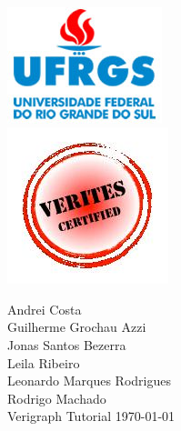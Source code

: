 \documentclass[12pt]{article}
\begin{document}
\begin{titlepage}

\center {\today}\\[2cm]

\includegraphics[scale = 3]{logo.jpg}\\[0.5cm]
\includegraphics[scale = 0.7]{LogoVerites.jpg}

 

\begin{titlepage}
\vfill
\begin{flushleft} 
{\large Andrei Costa \\
Guilherme Grochau Azzi \\
Jonas Santos Bezerra \\
Leila Ribeiro \\
Leonardo Marques Rodrigues \\
Rodrigo Machado } \\ [5cm] 
{\Huge Verigraph Tutorial}
\vfill
\today
\end{flushleft}
\end{titlepage}

\vfill %

\end{titlepage}

\tableofcontents
\end{document}
